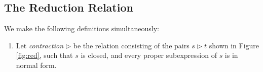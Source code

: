 
\subsection{The Reduction Relation}

\begin{definition}
We make the following definitions simultaneously:
\begin{enumerate}
\item
Let \emph{contraction} $\rhd$ be the relation consisting of the pairs $s \rhd t$ shown in Figure \ref{fig:red}, 
such that $s$ is closed, and every proper subexpression of $s$ is in normal form.


\end{enumerate}
\end{definition}
